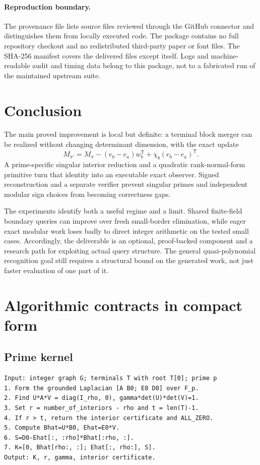 \documentclass[11pt,letterpaper]{article}
\theoremstyle{definition}\newtheorem{definition}[theorem]{Definition}
\theoremstyle{remark}\newtheorem{remark}[theorem]{Remark}
\newcommand{\trans}{^{\mathsf T}}
\begin{document}
\paragraph{Reproduction boundary.}
The provenance file lists source files reviewed through the GitHub connector and distinguishes them from locally executed code. The package contains no full repository checkout and no redistributed third-party paper or font files. The SHA-256 manifest covers the delivered files except itself. Logs and machine-readable audit and timing data belong to this package, not to a fabricated run of the maintained upstream suite.

\section{Conclusion}
The main proved improvement is local but definite: a terminal block merger can be realized without changing determinant dimension, with the exact update
\[
 M_{\pi'}=M_\pi-(e_b-e_a)w_b\trans+\chi_b(e_b-e_a)\trans.
\]
A prime-specific singular interior reduction and a quadratic rank-normal-form primitive turn that identity into an executable exact observer. Signed reconstruction and a separate verifier prevent singular primes and independent modular sign choices from becoming correctness gaps.

The experiments identify both a useful regime and a limit. Shared finite-field boundary queries can improve over fresh small-border elimination, while eager exact modular work loses badly to direct integer arithmetic on the tested small cases. Accordingly, the deliverable is an optional, proof-backed component and a research path for exploiting actual query structure. The general quasi-polynomial recognition goal still requires a structural bound on the generated work, not just faster evaluation of one part of it.

\appendix
\section{Algorithmic contracts in compact form}
\label{app:pseudo}

\subsection{Prime kernel}
\begin{lstlisting}
Input: integer graph G; terminals T with root T[0]; prime p
1. Form the grounded Laplacian [A B0; E0 D0] over F_p.
2. Find U*A*V = diag(I_rho, 0), gamma*det(U)*det(V)=1.
3. Set r = number_of_interiors - rho and t = len(T)-1.
4. If r > t, return the interior certificate and ALL_ZERO.
5. Compute Bhat=U*B0, Ehat=E0*V.
6. S=D0-Ehat[:, :rho]*Bhat[:rho, :].
7. K=[0, Bhat[rho:, :]; Ehat[:, rho:], S].
Output: K, r, gamma, interior certificate.
\end{lstlisting}
\end{document}
